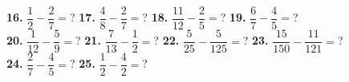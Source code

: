 \documentclass[a4paper]{article}
\begin{document}
\begin{Large}
\textbf{16.} $\dfrac{1}{2} - \dfrac{2}{7} =$? \hspace{0.2cm}
\textbf{17.} $\dfrac{4}{8} - \dfrac{2}{7} =$? \hspace{0.2cm}
\textbf{18.} $\dfrac{11}{12} - \dfrac{2}{5} =$? \hspace{0.2cm}
\textbf{19.} $\dfrac{6}{7} - \dfrac{4}{5} =$?  \\[1cm]
\textbf{20.} $\dfrac{1}{12} - \dfrac{5}{9} =$? \hspace{0.2cm}
\textbf{21.} $\dfrac{7}{13} - \dfrac{1}{2} =$? \hspace{0.2cm}
\textbf{22.} $\dfrac{5}{25} - \dfrac{5}{125} =$? \hspace{0.2cm}
\textbf{23.} $\dfrac{15}{150} - \dfrac{11}{121} =$? \\[1cm]
\textbf{24.} $\dfrac{2}{7} - \dfrac{4}{5} =$?  \hspace{0.2cm}
\textbf{25.} $\dfrac{1}{2} - \dfrac{4}{2} =$?

\end{Large}
\end{document}
